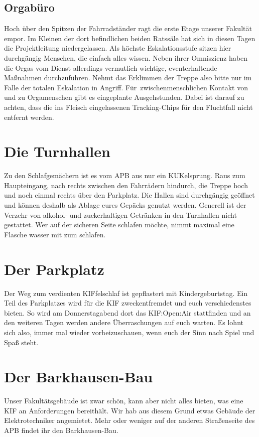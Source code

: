 \subsection*{Orgabüro}
Hoch über den Spitzen der Fahrradständer ragt die erste Etage unserer Fakultät empor.
Im Kleinen der dort befindlichen beiden Ratssäle hat sich in diesen Tagen die Projektleitung niedergelassen.
Als höchste Eskalationsstufe sitzen hier durchgängig Menschen, die einfach alles wissen.
Neben ihrer Omniszienz haben die Orgas vom Dienst allerdings vermutlich wichtige, eventerhaltende Maßnahmen durchzuführen.
Nehmt das Erklimmen der Treppe also bitte nur im Falle der totalen Eskalation in Angriff.
Für~zwischenmenschlichen Kontakt von und zu Orgamenschen gibt es eingeplante Ausgehstunden.
Dabei ist darauf zu achten, dass die ins Fleisch eingelassenen Tracking-Chips für den Fluchtfall nicht entfernt werden.

\section*{Die Turnhallen}
Zu den Schlafgemächern ist es vom APB aus nur ein KUKelsprung.
Raus zum Haupteingang, nach rechts zwischen den Fahrrädern hindurch, die Treppe hoch und noch einmal rechts über den Parkplatz.
Die Hallen sind durchgängig geöffnet und können deshalb als Ablage eures Gepäcks genutzt werden.
Generell ist der Verzehr von alkohol- und zuckerhaltigen Getränken in den Turnhallen nicht gestattet.
Wer auf der sicheren Seite schlafen möchte, nimmt maximal eine Flasche wasser mit zum schlafen.

\section*{Der Parkplatz}
Der Weg zum verdienten KIFfelschlaf ist gepflastert mit Kindergeburtstag.
Ein Teil des Parkplatzes wird für die KIF zweckentfremdet und euch verschiedenstes bieten.
So wird am Donnerstagabend dort das KIF:Open:Air stattfinden und an den weiteren Tagen werden andere Überraschungen auf euch warten.
Es lohnt sich also, immer mal wieder vorbeizuschauen, wenn euch der Sinn nach Spiel und Spaß steht.

\vfill

\pagebreak

\section*{Der Barkhausen-Bau}
Unser Fakultätsgebäude ist zwar schön, kann aber nicht alles bieten, was eine KIF an Anforderungen bereithält.
Wir hab aus diesem Grund etwas Gebäude der Elektrotechniker angemietet.
Mehr oder weniger auf der anderen Straßenseite des APB findet ihr den Barkhausen-Bau.

